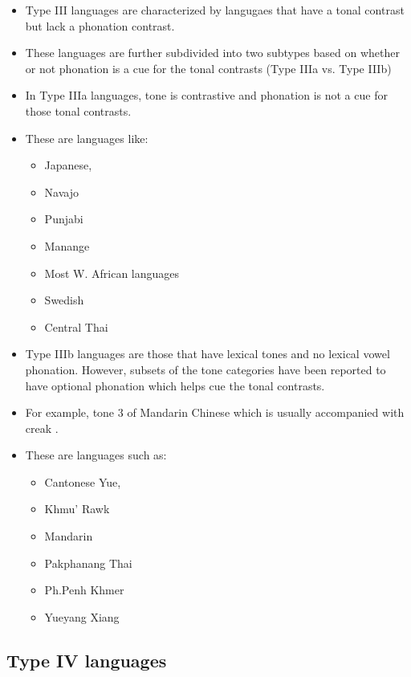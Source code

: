 \begin{itemize}
    \item Type III languages are characterized by langugaes that have a tonal contrast but lack a phonation contrast. 
    \item These languages are further subdivided into two subtypes based on whether or not phonation is a cue for the tonal contrasts (Type IIIa vs. Type IIIb)
    \item In Type IIIa languages, tone is contrastive and phonation is not a cue for those tonal contrasts.
    \item These are languages like:
    \begin{itemize}
        \item Japanese,
        \item Navajo
        \item Punjabi
        \item Manange
        \item Most W. African languages
        \item Swedish
        \item Central Thai
    \end{itemize}
    \item Type IIIb languages are those that have lexical tones and no lexical vowel phonation. However, subsets of the tone categories have been reported to have optional phonation which helps cue the tonal contrasts. 
    \item For example, tone 3 of Mandarin Chinese which is usually accompanied with creak \citep{kuangCovariationVoiceQuality2017}.
    \item These are languages such as: 
    \begin{itemize}
        \item Cantonese Yue,
        \item Khmu' Rawk
        \item Mandarin
        \item Pakphanang Thai
        \item Ph.Penh Khmer
        \item Yueyang Xiang
    \end{itemize}
\end{itemize}

\subsection{Type IV languages} \label{sec:TypeIV}

